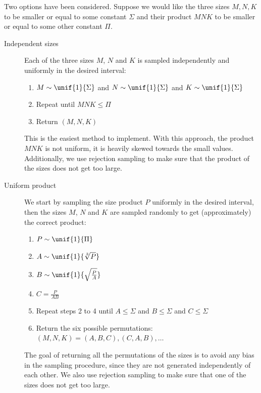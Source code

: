             Two options have been considered. Suppose we would like the three sizes \(M,N,K\) to be smaller or equal to
            some constant \(\Sigma\) and their product \(MNK\) to be smaller or equal to some other constant \(\Pi\).
            \begin{description}
                \item[Independent sizes] Each of the three sizes \(M\), \(N\) and \(K\) is sampled independently and
                    uniformly in the desired interval:
                    \begin{enumerate}
                        \item \(M \sim \unif{1}{\Sigma}\) and \(N \sim \unif{1}{\Sigma}\) and
                            \(K \sim \unif{1}{\Sigma}\)
                        \item Repeat until \(MNK \leq \Pi\)
                        \item Return \((M,N,K)\)
                    \end{enumerate}
                    This is the easiest method to implement. With this approach, the product
                    \(MNK\) is not uniform, it is heavily skewed towards the small values. Additionally, we use rejection
                    sampling to make sure that the product of the sizes does not get too large.
                \item[Uniform product] We start by sampling the size product \(P\) uniformly in the desired interval,
                    then the sizes \(M\), \(N\) and \(K\) are sampled randomly to get (approximately) the correct
                    product:
                    \begin{enumerate}
                        \item \(P \sim \unif{1}{\Pi}\)
                        \item \(A \sim \unif{1}{\sqrt[3]{P}}\)
                        \item \(B \sim \unif{1}{\sqrt{\frac{P}{A}}}\)
                        \item \(C = \frac{P}{AB}\)
                        \item Repeat steps 2 to 4 until \(A \leq \Sigma\) and \(B \leq \Sigma\) and \(C \leq \Sigma\)
                        \item Return the six possible permutations: \((M,N,K) = (A,B,C), (C,A,B), \dots\)
                    \end{enumerate}
                    The goal of returning all the permutations of the sizes is to avoid any bias in the sampling
                    procedure, since they are not generated independently of each other. We also use rejection sampling
                    to make sure that one of the sizes does not get too large.
            \end{description}

